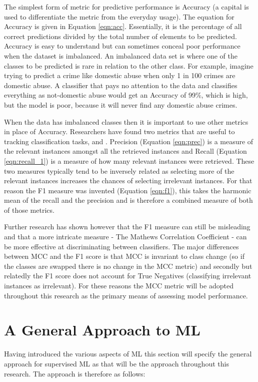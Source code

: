 The simplest form of metric for predictive performance is Accuracy (a capital  is used to differentiate the metric from the everyday usage). The equation for Accuracy is given in Equation \ref{eqn:acc}. Essentially, it is the percentage of all correct predictions divided by the total number of elements to be predicted. Accuracy is easy to understand but can sometimes conceal poor performance when the dataset is imbalanced. An imbalanced data set is where one of the classes to be predicted is rare in relation to the other class. For example, imagine trying to predict a crime like domestic abuse when only 1 in 100 crimes are domestic abuse. A classifier that pays no attention to the data and classifies everything as not-domestic abuse would get an Accuracy of 99\%, which is high, but the model is poor, because it will never find any domestic abuse crimes.

When the data has imbalanced classes then it is important to use other metrics in place of Accuracy. Researchers have found two metrics that are useful to tracking classification tasks,  and  \parencite[Chapter~5]{witten_frank_hall_pal_2017}. Precision (Equation \ref{eqn:prec}) is a measure of the relevant instances amongst all the retrieved instances and Recall (Equation \ref{eqn:recall_1}) is a measure of how many relevant instances were retrieved. These two measures typically tend to be inversely related as selecting more of the relevant instances increases the chances of selecting irrelevant instances. For that reason the F1 measure was invented (Equation \ref{eqn:f1}), this takes the harmonic mean of the recall and the precision and is therefore a combined measure of both of those metrics. 

Further research \parencite{chicco2020advantages} has shown however that the F1 measure can still be misleading and that a more intricate measure - The Mathews Correlation Coefficient - can be more effective at discriminating between classifiers. The major differences between MCC and the F1 score is that MCC is invariant to class change (so if the classes are swapped there is no change in the MCC metric) and secondly but relatedly the F1 score does not account for True Negatives (classifying irrelevant instances as irrelevant).  For these reasons the MCC metric will be adopted throughout this research as the primary means of assessing model performance. 
 

\section{A General Approach to ML} Having introduced the various aspects of ML this section will specify the general approach for supervised ML as that will be the approach throughout this research. The approach is therefore as follows:

